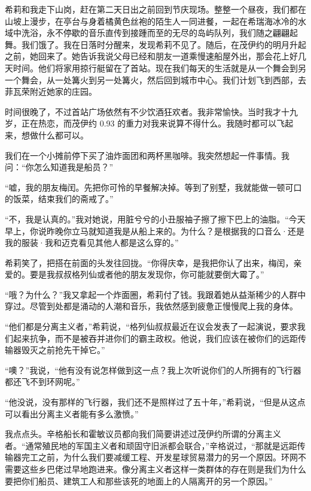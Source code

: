 \documentclass[AutoFakeBold=true]{book}
\begin{document}
\vspace*{1em}

希莉和我走下山岗，赶在第二天日出之前回到节庆现场。整整一个昼夜，我们都在山坡上漫步，在亭台与身着橘黄色丝袍的陌生人一同进餐，一起在希瑞海冰冷的水域中洗浴，永不停歇的音乐直传到接踵而至的无尽的岛屿队列，我们随之翩翩起舞。我们饿了。我在日落时分醒来，发现希莉不见了。随后，在茂伊约的明月升起之前，她回来了。她告诉我说父母已经和朋友一道乘慢速船屋外出，那会花上好几天时间。他们将家用掠行艇留在了首站。现在我们每天的生活就是从一个舞会到另一个舞会，从一处篝火到另一处篝火，然后回到城市中心。我们计划飞到西部，去菲瓦荣附近她家的庄园。

时间很晚了，不过首站广场依然有不少饮酒狂欢者。我非常愉快。当时我才十九岁，正在热恋，而茂伊约 0.93 的重力对我来说算不得什么。我随时都可以飞起来，想做什么都可以。

我们在一个小摊前停下买了油炸面团和两杯黑咖啡。我突然想起一件事情。我问：``你怎么知道我是船员？''

``嘘，我的朋友梅闰。先把你可怜的早餐解决掉。等到了别墅，我就能做一顿可口的饭菜，结束我们的斋戒了。''

``不，我是认真的。''我对她说，用脏兮兮的小丑服袖子擦了擦下巴上的油脂。``今天早上，你说昨晚你立马就知道我是从船上来的。为什么？是根据我的口音么·还是我的服装·我和迈克看见其他人都是这么穿的。''

希莉笑了，把搭在前面的头发往回拢。``你得庆幸，是我把你认了出来，梅闰，亲爱的。要是我叔叔格列仙或者他的朋友发现你，你可能就要倒大霉了。''

``哦？为什么？''我又拿起一个炸面圈，希莉付了钱。我跟着她从益渐稀少的人群中穿过。尽管到处都是涌动的人潮和音乐，我依然感到疲惫正慢慢爬上我的身体。

``他们都是分离主义者，''希莉说，``格列仙叔叔最近在议会发表了一起演说，要求我们起来抗争，而不是被吞并进你们的霸主政权。他说，我们应该在被你们的远距传输器毁灭之前抢先干掉它。''

``噢？''我说，``他有没有说怎样做到这一点？我上次听说你们的人所拥有的飞行器都还飞不到环网呢。''

``他没说，没有那样的飞行器，我们还不是照样过了五十年，''希莉说，``但是从这点可以看出分离主义者能有多么激愤。''

我点点头。辛格船长和霍敏议员都向我们简要讲述过茂伊约所谓的分离主义者。``通常殖民地的军国主义者和顽固守旧派都会联合，''辛格说过，``那就是远距传输器完工之前，为什么我们要减缓工程、开发星球贸易潜力的另一个原因。环网不需要这些乡巴佬过早地跑进来。像分离主义者这样一类群体的存在则是我们为什么要把你们船员、建筑工人和那些该死的地面上的人隔离开的另一个原因。''
\end{document}
